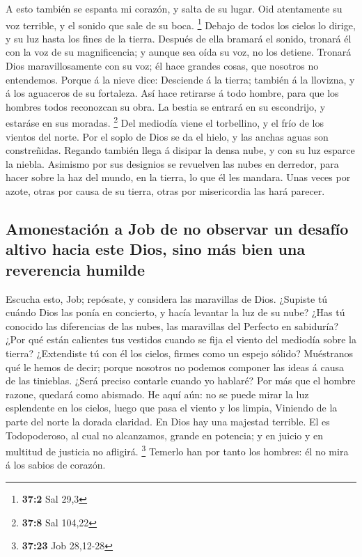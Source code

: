 A esto también se espanta mi corazón, y salta de su lugar.
 Oid atentamente su voz terrible, y el sonido que sale de su
boca. \footnote{\textbf{37:2} Sal 29,3}  Debajo de todos los
cielos lo dirige, y su luz hasta los fines de la tierra. 
Después de ella bramará el sonido, tronará él con la voz de su
magnificencia; y aunque sea oída su voz, no los detiene. 
Tronará Dios maravillosamente con su voz; él hace grandes cosas, que
nosotros no entendemos.  Porque á la nieve dice: Desciende á
la tierra; también á la llovizna, y á los aguaceros de su fortaleza.
 Así hace retirarse á todo hombre, para que los hombres
todos reconozcan su obra.  La bestia se entrará en su
escondrijo, y estaráse en sus moradas. \footnote{\textbf{37:8} Sal
  104,22}  Del mediodía viene el torbellino, y el frío de
los vientos del norte.  Por el soplo de Dios se da el
hielo, y las anchas aguas son constreñidas.  Regando
también llega á disipar la densa nube, y con su luz esparce la niebla.
 Asimismo por sus designios se revuelven las nubes en
derredor, para hacer sobre la haz del mundo, en la tierra, lo que él les
mandara.  Unas veces por azote, otras por causa de su
tierra, otras por misericordia las hará parecer.

\hypertarget{amonestaciuxf3n-a-job-de-no-observar-un-desafuxedo-altivo-hacia-este-dios-sino-muxe1s-bien-una-reverencia-humilde}{%
\subsection{Amonestación a Job de no observar un desafío altivo hacia
este Dios, sino más bien una reverencia
humilde}\label{amonestaciuxf3n-a-job-de-no-observar-un-desafuxedo-altivo-hacia-este-dios-sino-muxe1s-bien-una-reverencia-humilde}}

 Escucha esto, Job; repósate, y considera las maravillas de
Dios.  ¿Supiste tú cuándo Dios las ponía en concierto, y
hacía levantar la luz de su nube?  ¿Has tú conocido las
diferencias de las nubes, las maravillas del Perfecto en sabiduría?
 ¿Por qué están calientes tus vestidos cuando se fija el
viento del mediodía sobre la tierra?  ¿Extendiste tú con él
los cielos, firmes como un espejo sólido?  Muéstranos qué
le hemos de decir; porque nosotros no podemos componer las ideas á causa
de las tinieblas.  ¿Será preciso contarle cuando yo
hablaré? Por más que el hombre razone, quedará como abismado.
 He aquí aún: no se puede mirar la luz esplendente en los
cielos, luego que pasa el viento y los limpia,  Viniendo de
la parte del norte la dorada claridad. En Dios hay una majestad
terrible.  El es Todopoderoso, al cual no alcanzamos,
grande en potencia; y en juicio y en multitud de justicia no afligirá.
\footnote{\textbf{37:23} Job 28,12-28}  Temerlo han por
tanto los hombres: él no mira á los sabios de corazón.

